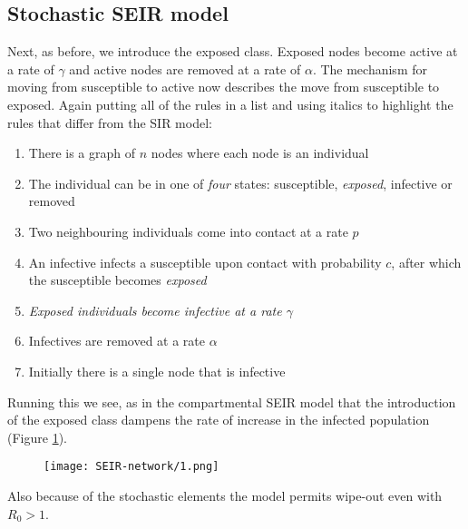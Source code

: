 \subsection{Stochastic SEIR model}
Next, as before, we introduce the exposed class. Exposed nodes become active at a rate of $\gamma$ and active nodes are removed at a rate of $\alpha$. The mechanism for moving from susceptible to active now describes the move from susceptible to exposed. Again putting all of the rules in a list and using italics to highlight the rules that differ from the SIR model:
\begin{enumerate}[nosep]
	\item There is a graph of $n$ nodes where each node is an individual
	\item The individual can be in one of \textit{four} states: susceptible, \textit{exposed}, infective or removed
	\item Two neighbouring individuals come into contact at a rate $p$
	\item An infective infects a susceptible upon contact with probability $c$, after which the susceptible becomes \textit{exposed}
	\item \textit{Exposed individuals become infective at a rate $\gamma$}
	\item Infectives are removed at a rate $\alpha$
	\item Initially there is a single node that is infective
\end{enumerate}
\bigskip
Running this we see, as in the compartmental SEIR model that the introduction of the exposed class dampens the rate of increase in the infected population (Figure \ref{fig:SEIR-network-1}).
\begin{figure}[h!]
	\centering
	\texttt{[image: SEIR-network/1.png]}
	\caption{}
	\label{fig:SEIR-network-1}
\end{figure}
Also because of the stochastic elements the model permits wipe-out even with $R_0>1$.
